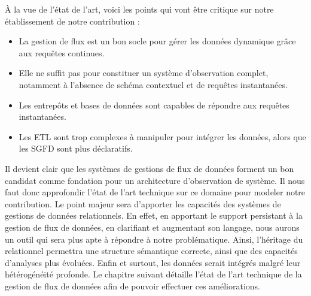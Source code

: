À la vue de l'état de l'art, voici les points qui vont être critique sur notre établissement de notre contribution :
\begin{itemize}
    \item La gestion de flux est un bon socle pour gérer les données dynamique grâce aux requêtes continues.
    \item Elle ne suffit pas pour constituer un système d'observation complet, notamment à l'absence de schéma contextuel et de requêtes instantanées.
    \item Les entrepôts et bases de données sont capables de répondre aux requêtes instantanées.
    \item Les ETL sont trop complexes à manipuler pour intégrer les données, alors que les SGFD sont plus déclaratifs.
\end{itemize}
Il devient clair que les systèmes de gestions de flux de données forment un bon candidat comme fondation pour un architecture d'observation de système. Il nous faut donc approfondir l'état de l'art technique sur ce domaine pour modeler notre contribution. Le point majeur sera d'apporter les capacités des systèmes de gestions de données relationnels. En effet, en apportant le support persistant à la gestion de flux de données, en clarifiant et augmentant son langage, nous aurons un outil qui sera plus apte à répondre à notre problématique. Ainsi, l'héritage du relationnel permettra une structure sémantique correcte, ainsi que des capacités d'analyses plus évoluées. Enfin et surtout, les données serait intégrés malgré leur hétérogénéité profonde. Le chapitre suivant détaille l'état de l'art technique de la gestion de flux de données afin de pouvoir effectuer ces améliorations.


